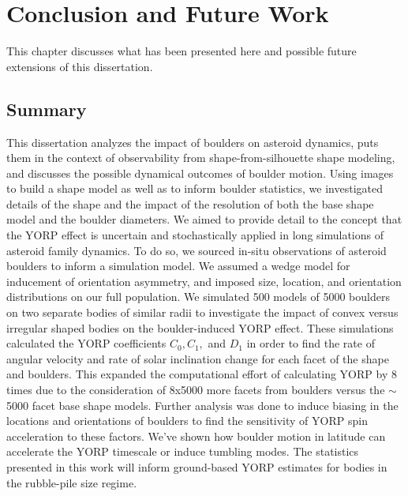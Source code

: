 \chapter{Conclusion and Future Work}
\label{future_work}
This chapter discusses what has been presented here and possible future extensions of this dissertation.

\section{Summary}
This dissertation analyzes the impact of boulders on asteroid dynamics, puts them in the context of observability from shape-from-silhouette shape modeling, and discusses the possible dynamical outcomes of boulder motion. Using images to build a shape model as well as to inform boulder statistics, we investigated details of the shape and the impact of the resolution of both the base shape model and the boulder diameters. We aimed to provide detail to the concept that the YORP effect is uncertain and stochastically applied in long simulations of asteroid family dynamics. To do so, we sourced in-situ observations of asteroid boulders to inform a simulation model. We assumed a wedge model for inducement of orientation asymmetry, and imposed size, location, and orientation distributions on our full population. We simulated 500 models of 5000 boulders on two separate bodies of similar radii to investigate the impact of convex versus irregular shaped bodies on the boulder-induced YORP effect. These simulations calculated the YORP coefficients $C_0, C_1,$ and $D_1$ in order to find the rate of angular velocity and rate of solar inclination change for each facet of the shape and boulders. This expanded the computational effort of calculating YORP by 8 times due to the consideration of 8x5000 more facets from boulders versus the $\sim$5000 facet base shape models. 
Further analysis was done to induce biasing in the locations and orientations of boulders to find the sensitivity of YORP spin acceleration to these factors. We've shown how boulder motion in latitude can accelerate the YORP timescale or induce tumbling modes. The statistics presented in this work will inform ground-based YORP estimates for bodies in the rubble-pile size regime.

